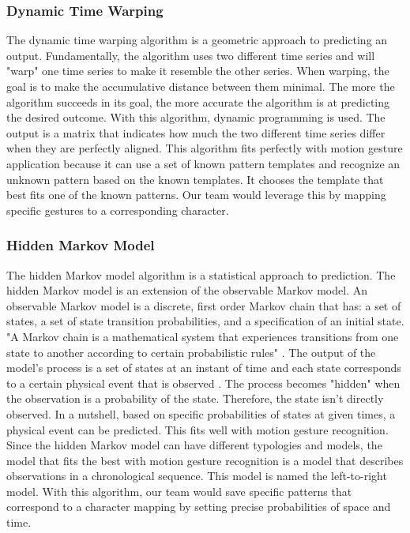 \documentclass[onecolumn, draftclsnofoot,10pt, journal, letterpaper]{IEEEtran}
\begin{document}
        \subsubsection{Dynamic Time Warping}
            The dynamic time warping algorithm is a geometric approach to predicting an output. Fundamentally, the algorithm uses two different time series and will "warp" one time series to make it resemble the other series. When warping, the goal is to make the accumulative distance between them minimal. The more the algorithm succeeds in its goal, the more accurate the algorithm is at predicting the desired outcome. With this algorithm, dynamic programming is used. The output is a matrix that indicates how much the two different time series differ when they are perfectly aligned. This algorithm fits perfectly with motion gesture application because it can use a set of known pattern templates and recognize an unknown pattern based on the known templates. It chooses the template that best fits one of the known patterns. Our team would leverage this by mapping specific gestures to a corresponding character.
    
        \subsubsection{Hidden Markov Model}
            The hidden Markov model algorithm is a statistical approach to prediction. The hidden Markov model is an extension of the observable Markov model. An observable Markov model is a discrete, first order Markov chain that has: a set of states, a set of state transition probabilities, and a specification of an initial state. "A Markov chain is a mathematical system that experiences transitions from one state to another according to certain probabilistic rules" \cite{henrymaltbyMarkovChains2019}. The output of the model's process is a set of states at an instant of time and each state corresponds to a certain physical event that is observed \cite{teamarasovicMotionBasedGestureRecognition2015}. The process becomes "hidden" when the observation is a probability of the state. Therefore, the state isn't directly observed. In a nutshell, based on specific probabilities of states at given times, a physical event can be predicted. This fits well with motion gesture recognition. Since the hidden Markov model can have different typologies and models, the model that fits the best with motion gesture recognition is a model that describes observations in a chronological sequence. This model is named the left-to-right model. With this algorithm, our team would save specific patterns that correspond to a character mapping by setting precise probabilities of space and time. 
    
\end{document}
